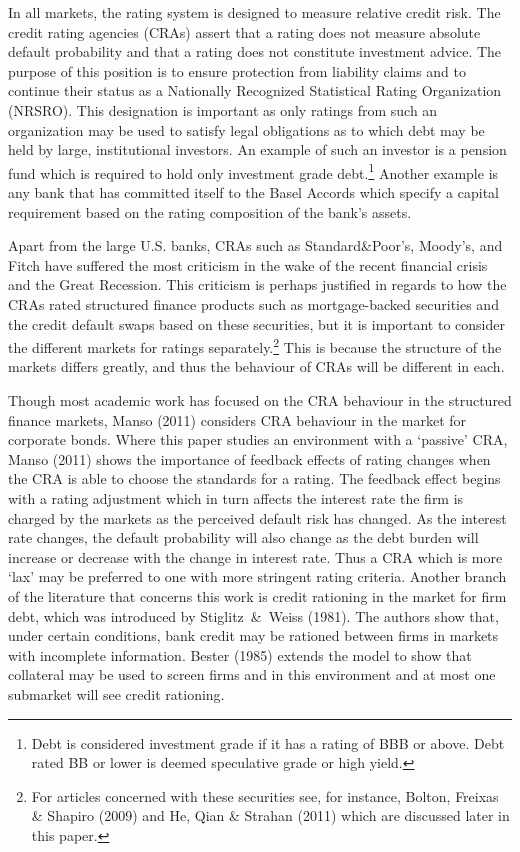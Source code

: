 \documentclass[notitlepage]{article}
\begin{document}
In all markets, the rating system is designed to measure relative credit risk. The credit rating agencies (CRAs) assert that a rating does not measure absolute default probability and that a rating does not constitute investment advice. The purpose of this position is to ensure protection from liability claims and to continue their status as a Nationally Recognized Statistical Rating Organization (NRSRO). This designation is important as only ratings from such an organization may be used to satisfy legal obligations as to which debt may be held by large, institutional investors. An example of such an investor is a pension fund which is required to hold only investment grade debt.\footnote{Debt is considered investment grade if it has a rating of BBB or above. Debt rated BB or lower is deemed speculative grade or high yield.} Another example is any bank that has committed itself to the Basel Accords which specify a capital requirement based on the rating composition of the bank's assets.

Apart from the large U.S. banks, CRAs such as Standard\&Poor's, Moody's, and Fitch have suffered the most criticism in the wake of the recent financial crisis and the Great Recession. This criticism is perhaps justified in regards to how the CRAs rated structured finance products such as mortgage-backed securities and the credit default swaps based on these securities, but it is important to consider the different markets for ratings separately.\footnote{For articles concerned with these securities see, for instance, Bolton, Freixas \& Shapiro (2009) and He, Qian \& Strahan (2011) which are discussed later in this paper.} This is because the structure of the markets differs greatly, and thus the behaviour of CRAs will be different in each.

Though most academic work has focused on the CRA behaviour in the structured finance markets, Manso (2011) considers CRA behaviour in the market for corporate bonds. Where this paper studies an environment with a `passive' CRA, Manso (2011) shows the importance of feedback effects of rating changes when the CRA is able to choose the standards for a rating. The feedback effect begins with a rating adjustment which in turn affects the interest rate the firm is charged by the markets as the perceived default risk has changed. As the interest rate changes, the default probability will also change as the debt burden will increase or decrease with the change in interest rate. Thus a CRA which is more `lax' may be preferred to one with more stringent rating criteria. Another branch of the literature that concerns this work is credit rationing in the market for firm debt, which was introduced by Stiglitz~\&~Weiss (1981). The authors show that, under certain conditions, bank credit may be rationed between firms in markets with incomplete information. Bester (1985) extends the model to show that collateral may be used to screen firms and in this environment and at most one submarket will see credit rationing.
\end{document}
